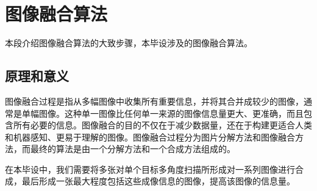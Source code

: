 \documentclass{xduugthesis}
\begin{document}
\section{图像融合算法}
本段介绍图像融合算法的大致步骤，本毕设涉及的图像融合算法。
\subsection{原理和意义}
图像融合过程是指从多幅图像中收集所有重要信息，并将其合并成较少的图像，通常是单幅图像。这种单一图像比任何单一来源的图像信息量更大、更准确，而且包含所有必要的信息。图像融合的目的不仅在于减少数据量，还在于构建更适合人类和机器感知、更易于理解的图像。图像融合过程分为图片分解方法和图像融合方法，而最终的算法是由一个分解方法和一个合成方法组成的。\par
在本毕设中，我们需要将多张对单个目标多角度扫描所形成对一系列图像进行合成，最后形成一张最大程度包括这些成像信息的图像，提高该图像的信息量。
\end{document}

